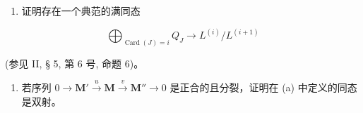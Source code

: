 \begin{enumerate}
\def\labelenumi{(\alph{enumi})}
\tightlist
\item
  证明存在一个典范的满同态
\end{enumerate}

\[
\bigoplus_ {\operatorname{Card} (J) = i} Q _ {J} \rightarrow L ^ {(i)} / L ^ {(i + 1)}
\]

(参见 II, § 5, 第 6 号, 命题 6)。

\begin{enumerate}
\def\labelenumi{(\alph{enumi})}
\setcounter{enumi}{1}
\tightlist
\item
  若序列 \(0 \to \mathbf{M}' \xrightarrow{u} \mathbf{M} \xrightarrow{v} \mathbf{M}'' \to 0\) 是正合的且分裂，证明在 (a) 中定义的同态是双射。
\end{enumerate}

